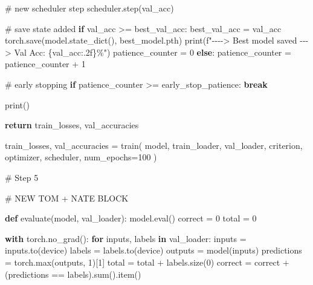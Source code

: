 \documentclass[
  letterpaper,
  DIV=11,
  numbers=noendperiod]{scrartcl}
\newenvironment{Shaded}{\begin{snugshade}}{\end{snugshade}}
\newcommand{\BuiltInTok}[1]{\textcolor[rgb]{0.00,0.23,0.31}{#1}}
\newcommand{\CommentTok}[1]{\textcolor[rgb]{0.37,0.37,0.37}{#1}}
\newcommand{\ControlFlowTok}[1]{\textcolor[rgb]{0.00,0.23,0.31}{\textbf{#1}}}
\newcommand{\DecValTok}[1]{\textcolor[rgb]{0.68,0.00,0.00}{#1}}
\newcommand{\KeywordTok}[1]{\textcolor[rgb]{0.00,0.23,0.31}{\textbf{#1}}}
\newcommand{\NormalTok}[1]{\textcolor[rgb]{0.00,0.23,0.31}{#1}}
\newcommand{\OperatorTok}[1]{\textcolor[rgb]{0.37,0.37,0.37}{#1}}
\newcommand{\SpecialCharTok}[1]{\textcolor[rgb]{0.37,0.37,0.37}{#1}}
\newcommand{\SpecialStringTok}[1]{\textcolor[rgb]{0.13,0.47,0.30}{#1}}
\newcommand{\StringTok}[1]{\textcolor[rgb]{0.13,0.47,0.30}{#1}}
\begin{document}
\begin{Shaded}
\begin{Highlighting}[]
        \CommentTok{\# new scheduler step}
\NormalTok{        scheduler.step(val\_acc)}

        \CommentTok{\# save state added}
        \ControlFlowTok{if}\NormalTok{ val\_acc }\OperatorTok{\textgreater{}=}\NormalTok{ best\_val\_acc:}
\NormalTok{            best\_val\_acc }\OperatorTok{=}\NormalTok{ val\_acc}
\NormalTok{            torch.save(model.state\_dict(), }\StringTok{\textquotesingle{}best\_model.pth\textquotesingle{}}\NormalTok{)}
            \BuiltInTok{print}\NormalTok{(}\SpecialStringTok{f"{-}{-}{-}{-}\textgreater{} Best model saved {-}{-}{-}\textgreater{} Val Acc: }\SpecialCharTok{\{}\NormalTok{val\_acc}\SpecialCharTok{:.2f\}}\SpecialStringTok{\%"}\NormalTok{)}
\NormalTok{            patience\_counter }\OperatorTok{=} \DecValTok{0}
        \ControlFlowTok{else}\NormalTok{:}
\NormalTok{            patience\_counter }\OperatorTok{=}\NormalTok{ patience\_counter }\OperatorTok{+} \DecValTok{1}

        \CommentTok{\# early stopping}
        \ControlFlowTok{if}\NormalTok{ patience\_counter }\OperatorTok{\textgreater{}=}\NormalTok{ early\_stop\_patience:}
            \ControlFlowTok{break}

        \BuiltInTok{print}\NormalTok{()}

    \ControlFlowTok{return}\NormalTok{ train\_losses, val\_accuracies}

\NormalTok{train\_losses, val\_accuracies }\OperatorTok{=}\NormalTok{ train(}
\NormalTok{    model,}
\NormalTok{    train\_loader,}
\NormalTok{    val\_loader,}
\NormalTok{    criterion,}
\NormalTok{    optimizer,}
\NormalTok{    scheduler,}
\NormalTok{    num\_epochs}\OperatorTok{=}\DecValTok{100}
\NormalTok{)}


\CommentTok{\# Step 5}

\CommentTok{\# NEW TOM + NATE BLOCK}

\KeywordTok{def}\NormalTok{ evaluate(model, val\_loader):}
\NormalTok{    model.}\BuiltInTok{eval}\NormalTok{()}
\NormalTok{    correct }\OperatorTok{=} \DecValTok{0}
\NormalTok{    total }\OperatorTok{=} \DecValTok{0}

    \ControlFlowTok{with}\NormalTok{ torch.no\_grad():}
        \ControlFlowTok{for}\NormalTok{ inputs, labels }\KeywordTok{in}\NormalTok{ val\_loader:}
\NormalTok{            inputs }\OperatorTok{=}\NormalTok{ inputs.to(device)}
\NormalTok{            labels }\OperatorTok{=}\NormalTok{ labels.to(device)}
\NormalTok{            outputs }\OperatorTok{=}\NormalTok{ model(inputs)}
\NormalTok{            predictions }\OperatorTok{=}\NormalTok{ torch.}\BuiltInTok{max}\NormalTok{(outputs, }\DecValTok{1}\NormalTok{)[}\DecValTok{1}\NormalTok{]}
\NormalTok{            total }\OperatorTok{=}\NormalTok{ total }\OperatorTok{+}\NormalTok{ labels.size(}\DecValTok{0}\NormalTok{)}
\NormalTok{            correct }\OperatorTok{=}\NormalTok{ correct }\OperatorTok{+}\NormalTok{ (predictions }\OperatorTok{==}\NormalTok{ labels).}\BuiltInTok{sum}\NormalTok{().item()}


\end{Highlighting}
\end{Shaded}
\end{document}
